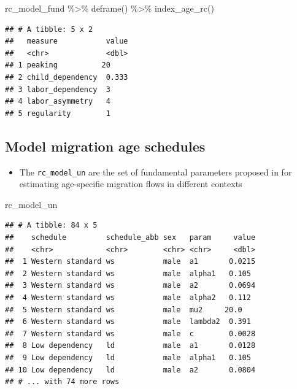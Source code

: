 \documentclass[
]{book}
\newenvironment{Shaded}{\begin{snugshade}}{\end{snugshade}}
\newcommand{\FunctionTok}[1]{\textcolor[rgb]{0.00,0.00,0.00}{#1}}
\newcommand{\NormalTok}[1]{#1}
\newcommand{\SpecialCharTok}[1]{\textcolor[rgb]{0.00,0.00,0.00}{#1}}
\providecommand{\tightlist}{%
  \setlength{\itemsep}{0pt}\setlength{\parskip}{0pt}}
\begin{document}
\begin{Shaded}
\begin{Highlighting}[]
\NormalTok{rc\_model\_fund }\SpecialCharTok{\%\textgreater{}\%}
  \FunctionTok{deframe}\NormalTok{() }\SpecialCharTok{\%\textgreater{}\%}
  \FunctionTok{index\_age\_rc}\NormalTok{()}
\end{Highlighting}
\end{Shaded}

\begin{verbatim}
## # A tibble: 5 x 2
##   measure           value
##   <chr>             <dbl>
## 1 peaking          20    
## 2 child_dependency  0.333
## 3 labor_dependency  3    
## 4 labor_asymmetry   4    
## 5 regularity        1
\end{verbatim}

\hypertarget{model-migration-age-schedules-4}{%
\subsection{Model migration age schedules}\label{model-migration-age-schedules-4}}

\begin{itemize}
\tightlist
\item
  The \texttt{rc\_model\_un} are the set of fundamental parameters proposed in \citet{UnitedNations1992} for estimating age-specific migration flows in different contexts
\end{itemize}

\begin{Shaded}
\begin{Highlighting}[]
\NormalTok{rc\_model\_un}
\end{Highlighting}
\end{Shaded}

\begin{verbatim}
## # A tibble: 84 x 5
##    schedule         schedule_abb sex   param     value
##    <chr>            <chr>        <chr> <chr>     <dbl>
##  1 Western standard ws           male  a1       0.0215
##  2 Western standard ws           male  alpha1   0.105 
##  3 Western standard ws           male  a2       0.0694
##  4 Western standard ws           male  alpha2   0.112 
##  5 Western standard ws           male  mu2     20.0   
##  6 Western standard ws           male  lambda2  0.391 
##  7 Western standard ws           male  c        0.0028
##  8 Low dependency   ld           male  a1       0.0128
##  9 Low dependency   ld           male  alpha1   0.105 
## 10 Low dependency   ld           male  a2       0.0804
## # ... with 74 more rows
\end{verbatim}
\end{document}
